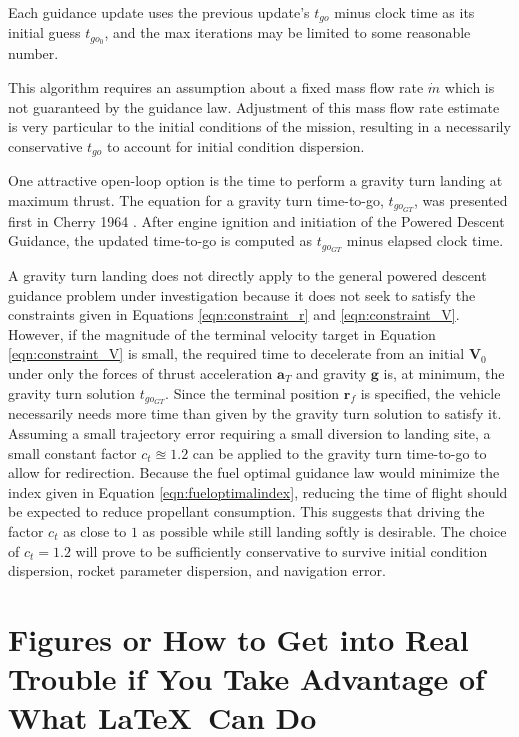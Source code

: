 Each guidance update uses the previous update's $t_{go}$ minus clock time as its initial guess $t_{go_0}$, and the max iterations may be limited to some reasonable number.

This algorithm requires an assumption about a fixed mass flow rate $\dot{m}$ which is not guaranteed by the guidance law. Adjustment of this mass flow rate estimate is very particular to the initial conditions of the mission, resulting in a necessarily conservative $t_{go}$ to account for initial condition dispersion.

One attractive open-loop option is the time to perform a gravity turn landing at maximum thrust. The equation for a gravity turn time-to-go, $t_{go_{GT}}$, was presented first in Cherry 1964 \cite{CHERRY}. After engine ignition and initiation of the Powered Descent Guidance, the updated time-to-go is computed as $t_{go_{GT}}$ minus elapsed clock time.

A gravity turn landing does not directly apply to the general powered descent guidance problem under investigation because it does not seek to satisfy the constraints given in Equations \ref{eqn:constraint_r} and \ref{eqn:constraint_V}. However, if the magnitude of the terminal velocity target in Equation \ref{eqn:constraint_V} is small, the required time to decelerate from an initial $\boldsymbol{V}_0$ under only the forces of thrust acceleration $\boldsymbol{a}_T$ and gravity $\boldsymbol{g}$ is, at minimum, the gravity turn solution $t_{go_{GT}}$. Since the terminal position $\boldsymbol{r}_f$ is specified, the vehicle necessarily needs more time than given by the gravity turn solution to satisfy it. Assuming a small trajectory error requiring a small diversion to landing site, a small constant factor $ c_t \approxeq 1.2$ can be applied to the gravity turn time-to-go to allow for redirection. Because the fuel optimal guidance law would minimize the index given in Equation \ref{eqn:fueloptimalindex}, reducing the time of flight should be expected to reduce propellant consumption. This suggests that driving the factor $c_t$ as close to $1$ as possible while still landing softly is desirable. The choice of $c_t = 1.2$ will prove to be sufficiently conservative to survive initial condition dispersion, rocket parameter dispersion, and navigation error. 

\section{Figures or How to Get into Real Trouble if You Take Advantage
  of What \LaTeX\ Can Do}

